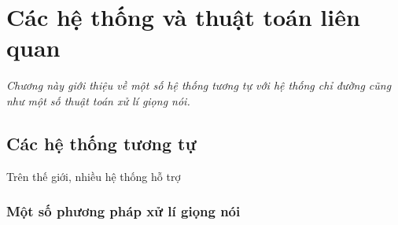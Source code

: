 \chapter{Các hệ thống và thuật toán liên quan}
\label{Chapter2}

\emph{Chương này giới thiệu về một số hệ thống tương tự với hệ thống chỉ đường cũng như một số thuật toán xử lí giọng nói.}

\section{Các hệ thống tương tự}

Trên thế giới, nhiều hệ thống hỗ trợ

\subsection{Một số phương pháp xử lí giọng nói}